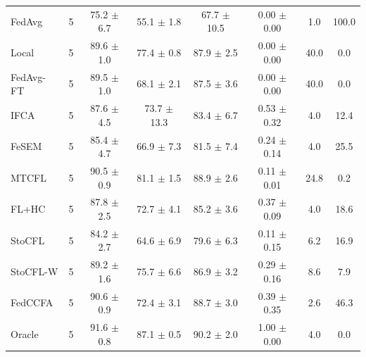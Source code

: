 {\begin{tabular}{l r c c c c c c}
FedAvg & 5 & 75.2 $\pm$ 6.7 & 55.1 $\pm$ 1.8 & 67.7 $\pm$ 10.5 & 0.00 $\pm$ 0.00 & 1.0 & 100.0 \\
Local & 5 & 89.6 $\pm$ 1.0 & 77.4 $\pm$ 0.8 & 87.9 $\pm$ 2.5 & 0.00 $\pm$ 0.00 & 40.0 & 0.0 \\
FedAvg-FT & 5 & 89.5 $\pm$ 1.0 & 68.1 $\pm$ 2.1 & 87.5 $\pm$ 3.6 & 0.00 $\pm$ 0.00 & 40.0 & 0.0 \\
IFCA & 5 & 87.6 $\pm$ 4.5 & 73.7 $\pm$ 13.3 & 83.4 $\pm$ 6.7 & 0.53 $\pm$ 0.32 & 4.0 & 12.4 \\
FeSEM & 5 & 85.4 $\pm$ 4.7 & 66.9 $\pm$ 7.3 & 81.5 $\pm$ 7.4 & 0.24 $\pm$ 0.14 & 4.0 & 25.5 \\
MTCFL & 5 & 90.5 $\pm$ 0.9 & 81.1 $\pm$ 1.5 & 88.9 $\pm$ 2.6 & 0.11 $\pm$ 0.01 & 24.8 & 0.2 \\
FL+HC & 5 & 87.8 $\pm$ 2.5 & 72.7 $\pm$ 4.1 & 85.2 $\pm$ 3.6 & 0.37 $\pm$ 0.09 & 4.0 & 18.6 \\
StoCFL & 5 & 84.2 $\pm$ 2.7 & 64.6 $\pm$ 6.9 & 79.6 $\pm$ 6.3 & 0.11 $\pm$ 0.15 & 6.2 & 16.9 \\
StoCFL-W & 5 & 89.2 $\pm$ 1.6 & 75.7 $\pm$ 6.6 & 86.9 $\pm$ 3.2 & 0.29 $\pm$ 0.16 & 8.6 & 7.9 \\
FedCCFA & 5 & 90.6 $\pm$ 0.9 & 72.4 $\pm$ 3.1 & 88.7 $\pm$ 3.0 & 0.39 $\pm$ 0.35 & 2.6 & 46.3 \\
Oracle & 5 & 91.6 $\pm$ 0.8 & 87.1 $\pm$ 0.5 & 90.2 $\pm$ 2.0 & 1.00 $\pm$ 0.00 & 4.0 & 0.0 \\
\bottomrule
\end{tabular}
}
